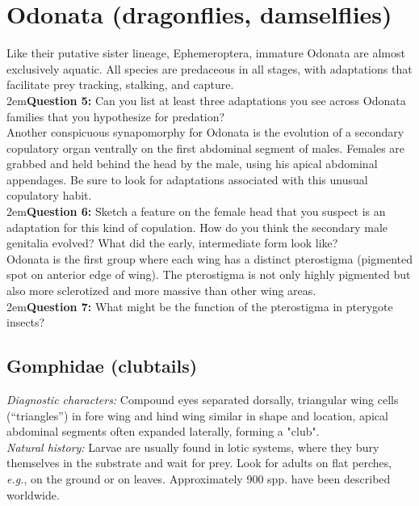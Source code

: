 \documentclass[letterpaper, 11pt]{article}
\begin{document}
\FloatBarrier

\section{Odonata (dragonflies, damselflies)}
Like their putative sister lineage, Ephemeroptera, immature Odonata are almost exclusively aquatic. All species are predaceous in all stages, with adaptations that facilitate prey tracking, stalking, and capture. \\

\hangindent2em\textbf{Question 5:} Can you list at least three adaptations you see across Odonata families that you hypothesize for predation?\\

\noindent{}Another conspicuous synapomorphy for Odonata is the evolution of a secondary copulatory organ ventrally on the first abdominal segment of males. Females are grabbed and held behind the head by the male, using his apical abdominal appendages. Be sure to look for adaptations associated with this unusual copulatory habit.\\

\hangindent2em\textbf{Question 6:} Sketch a feature on the female head that you suspect is an adaptation for this kind of copulation. How do you think the secondary male genitalia evolved? What did the early, intermediate form look like?\\

\noindent{}Odonata is the first group where each wing has a distinct pterostigma (pigmented spot on anterior edge of wing). The pterostigma is not only highly pigmented but also more sclerotized and more massive than other wing areas. \\

\hangindent2em\textbf{Question 7:} What might be the function of the pterostigma in pterygote insects?\\

\subsection{Gomphidae (clubtails)}
\noindent{}\textit{Diagnostic characters:} Compound eyes separated dorsally, triangular wing cells (``triangles'') in fore wing and hind wing similar in shape and location, apical abdominal segments often expanded laterally, forming a "club".\\

\noindent{}\textit{Natural history:} Larvae are usually found in lotic systems, where they bury themselves in the substrate and wait for prey. Look for adults on flat perches, \textit{e.g.}, on the ground or on leaves. Approximately 900 spp. have been described worldwide.
\end{document}
